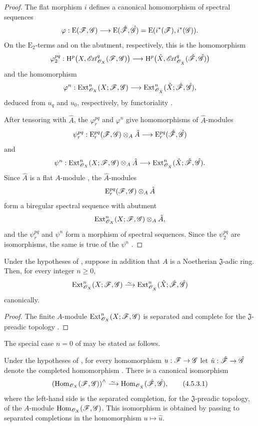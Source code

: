 \begin{proof}
The flat morphism $i$ defines a canonical homomorphism of spectral
sequences
\[
  \varphi:\mathrm{E}(\mathscr{F},\mathscr{G})
  \longrightarrow
  \mathrm{E}(\hat{\mathscr{F}},\hat{\mathscr{G}})
  =
  \mathrm{E}(i^*(\mathscr{F}),i^*(\mathscr{G})).
\]
On the $\mathrm{E}_2$-terms and on the abutment, respectively, this
is the homomorphism
\[
  \varphi_2^{pq}:
  \mathrm{H}^p\bigl(X,\mathscr{E}\!\mathit{xt}^q_{\mathscr{O}_X}(\mathscr{F},\mathscr{G})\bigr)
  \longrightarrow
  \mathrm{H}^p\bigl(\hat{X},
    \mathscr{E}\!\mathit{xt}^q_{\mathscr{O}_{\hat{X}}}
      (\hat{\mathscr{F}},\hat{\mathscr{G}})\bigr)
\]
and the homomorphism
\[
  \varphi^n:
  \operatorname{Ext}^n_{\mathscr{O}_X}(X;\mathscr{F},\mathscr{G})
  \longrightarrow
  \operatorname{Ext}^n_{\mathscr{O}_{\hat{X}}}
    (\hat{X};\hat{\mathscr{F}},\hat{\mathscr{G}}),
\]
deduced from $u_q$ and $u_0$, respectively, by functoriality
.

After tensoring with $\hat{A}$, the $\varphi_r^{pq}$ and
$\varphi^n$ give homomorphisms of $\hat{A}$-modules
\[
  \psi_r^{pq}:
  \mathrm{E}_r^{pq}(\mathscr{F},\mathscr{G})\otimes_A\hat{A}
  \longrightarrow
  \mathrm{E}_r^{pq}(\hat{\mathscr{F}},\hat{\mathscr{G}})
\]
and
\[
  \psi^n:
  \operatorname{Ext}^n_{\mathscr{O}_X}(X;\mathscr{F},\mathscr{G})\otimes_A\hat{A}
  \longrightarrow
  \operatorname{Ext}^n_{\mathscr{O}_{\hat{X}}}
    (\hat{X};\hat{\mathscr{F}},\hat{\mathscr{G}}).
\]
Since $\hat{A}$ is a flat $A$-module , the
$\hat{A}$-modules
\[
  \mathrm{E}_r^{pq}(\mathscr{F},\mathscr{G})\otimes_A\hat{A}
\]
form a biregular spectral sequence with abutment
\[
  \operatorname{Ext}^n_{\mathscr{O}_X}(X;\mathscr{F},\mathscr{G})\otimes_A\hat{A},
\]
and the $\psi_r^{pq}$ and $\psi^n$ form a morphism of spectral
sequences.  Since the $\psi_2^{pq}$ are isomorphisms, the same is true
of the $\psi^n$ .
\end{proof}

\begin{corollary}[4.5.2]
\label{III.4.5.2}
Under the hypotheses of , suppose in addition that
$A$ is a Noetherian $\mathfrak J$-adic ring.  Then, for every integer
$n\geq0$,
\[
  \Ext^n_{\sh{O}_X}(X;\sh{F},\sh{G})
  \isoto
  \Ext^n_{\sh{O}_{\hat{X}}}
    (\hat{X};\hat{\sh{F}},\hat{\sh{G}})
\]
canonically.
\end{corollary}

\begin{proof}
The finite $A$-module
$\operatorname{Ext}^n_{\mathscr{O}_X}(X;\mathscr{F},\mathscr{G})$ is separated and complete for
the $\mathfrak J$-preadic topology .
\end{proof}

The special case $n=0$ of  may be stated as follows.

\begin{corollary}[4.5.3]
\label{III.4.5.3}
Under the hypotheses of , for every homomorphism
$u:\mathscr{F}\to\mathscr{G}$ let $\hat{u}:\hat{\mathscr{F}}\to\hat{\mathscr{G}}$
denote the completed homomorphism .  There is a
canonical isomorphism
\[
\label{III.4.5.3.1}
  \left(\Hom_{\sh{O}_X}(\sh{F},\sh{G})\right)^\wedge
  \isoto
  \Hom_{\sh{O}_{\hat{X}}}(\hat{\sh{F}},\hat{\sh{G}}),
  \tag{4.5.3.1}
\]
where the left-hand side is the separated completion, for the
$\mathfrak J$-preadic topology, of the $A$-module
$\operatorname{Hom}_{\mathscr{O}_X}(\mathscr{F},\mathscr{G})$.  This isomorphism is obtained by
passing to separated completions in the homomorphism
$u\mapsto\hat{u}$.
\end{corollary}


